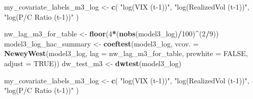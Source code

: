 \documentclass[
]{article}
\newenvironment{Shaded}{\begin{snugshade}}{\end{snugshade}}
\newcommand{\AttributeTok}[1]{\textcolor[rgb]{0.13,0.29,0.53}{#1}}
\newcommand{\ConstantTok}[1]{\textcolor[rgb]{0.56,0.35,0.01}{#1}}
\newcommand{\DecValTok}[1]{\textcolor[rgb]{0.00,0.00,0.81}{#1}}
\newcommand{\FunctionTok}[1]{\textcolor[rgb]{0.13,0.29,0.53}{\textbf{#1}}}
\newcommand{\NormalTok}[1]{#1}
\newcommand{\OtherTok}[1]{\textcolor[rgb]{0.56,0.35,0.01}{#1}}
\newcommand{\SpecialCharTok}[1]{\textcolor[rgb]{0.81,0.36,0.00}{\textbf{#1}}}
\newcommand{\StringTok}[1]{\textcolor[rgb]{0.31,0.60,0.02}{#1}}
\begin{document}
\begin{Shaded}
\begin{Highlighting}[]
\NormalTok{  my\_covariate\_labels\_m3\_log }\OtherTok{\textless{}{-}} \FunctionTok{c}\NormalTok{(}
    \StringTok{"log(VIX (t{-}1))"}\NormalTok{,}
    \StringTok{"log(RealizedVol (t{-}1))"}\NormalTok{,}
    \StringTok{"log(P/C Ratio (t{-}1))"}
\NormalTok{  )}
  
\NormalTok{  nw\_lag\_m3\_for\_table }\OtherTok{\textless{}{-}} \FunctionTok{floor}\NormalTok{(}\DecValTok{4}\SpecialCharTok{*}\NormalTok{(}\FunctionTok{nobs}\NormalTok{(model3\_log)}\SpecialCharTok{/}\DecValTok{100}\NormalTok{)}\SpecialCharTok{\^{}}\NormalTok{(}\DecValTok{2}\SpecialCharTok{/}\DecValTok{9}\NormalTok{))}
\NormalTok{  model3\_log\_hac\_summary }\OtherTok{\textless{}{-}} \FunctionTok{coeftest}\NormalTok{(model3\_log, }\AttributeTok{vcov. =} \FunctionTok{NeweyWest}\NormalTok{(model3\_log, }\AttributeTok{lag =}\NormalTok{ nw\_lag\_m3\_for\_table, }\AttributeTok{prewhite =} \ConstantTok{FALSE}\NormalTok{, }\AttributeTok{adjust =} \ConstantTok{TRUE}\NormalTok{))}
\NormalTok{  dw\_test\_m3 }\OtherTok{\textless{}{-}} \FunctionTok{dwtest}\NormalTok{(model3\_log)}


  
\NormalTok{  my\_covariate\_labels\_m3\_log }\OtherTok{\textless{}{-}} \FunctionTok{c}\NormalTok{(}
    \StringTok{"log(VIX (t{-}1))"}\NormalTok{,}
    \StringTok{"log(RealizedVol (t{-}1))"}\NormalTok{,}
    \StringTok{"log(P/C Ratio (t{-}1))"}
\NormalTok{  )}
\end{Highlighting}
\end{Shaded}
\end{document}
